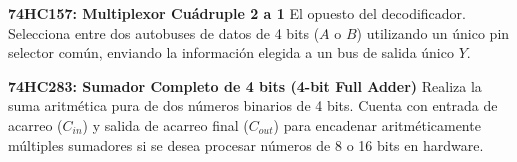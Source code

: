 \textbf{74HC157: Multiplexor Cuádruple 2 a 1}
El opuesto del decodificador. Selecciona entre dos autobuses de datos de 4 bits ($A$ o $B$) utilizando un único pin selector común, enviando la información elegida a un bus de salida único $Y.$

\textbf{74HC283: Sumador Completo de 4 bits (4-bit Full Adder)}
Realiza la suma aritmética pura de dos números binarios de 4 bits. Cuenta con entrada de acarreo ($C_{in}$) y salida de acarreo final ($C_{out}$) para encadenar aritméticamente múltiples sumadores si se desea procesar números de 8 o 16 bits en hardware.
